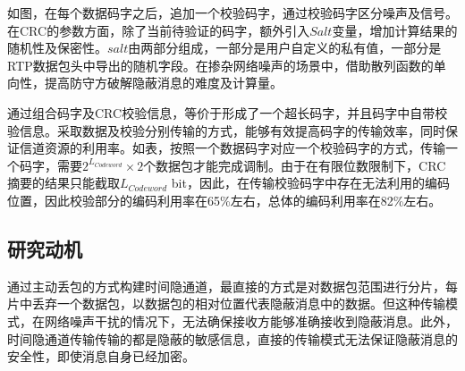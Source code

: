 如图，在每个数据码字之后，追加一个校验码字，通过校验码字区分噪声及信号。在CRC的参数方面，除了当前待验证的码字，额外引入$Salt$变量，增加计算结果的随机性及保密性。$salt$由两部分组成，一部分是用户自定义的私有值，一部分是RTP数据包头中导出的随机字段。在掺杂网络噪声的场景中，借助散列函数的单向性，提高防守方破解隐蔽消息的难度及计算量。


通过组合码字及CRC校验信息，等价于形成了一个超长码字，并且码字中自带校验信息。采取数据及校验分别传输的方式，能够有效提高码字的传输效率，同时保证信道资源的利用率。如表，按照一个数据码字对应一个校验码字的方式，传输一个码字，需要$2^{L_{Codeword}}\times 2$个数据包才能完成调制。由于在有限位数限制下，CRC摘要的结果只能截取$L_{Codeword}$ bit，因此，在传输校验码字中存在无法利用的编码位置，因此校验部分的编码利用率在65\%左右，总体的编码利用率在82\%左右。

\subsection{研究动机}
\label{chap:zigzag:motivation:conclude}
通过主动丢包的方式构建时间隐通道，最直接的方式是对数据包范围进行分片，每片中丢弃一个数据包，以数据包的相对位置代表隐蔽消息中的数据。但这种传输模式，在网络噪声干扰的情况下，无法确保接收方能够准确接收到隐蔽消息。此外，时间隐通道传输传输的都是隐蔽的敏感信息，直接的传输模式无法保证隐蔽消息的安全性，即使消息自身已经加密。

